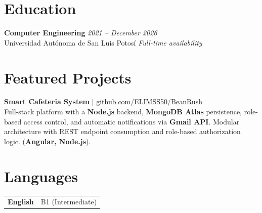 \documentclass[10pt,a4paper]{article}
\begin{document}
\section{Education}
\noindent\textbf{Computer Engineering} \hfill \textit{2021 -- December 2026} \\
Universidad Autónoma de San Luis Potosí \hfill \textit{Full-time availability} \\[0.05em]

\section{Featured Projects}

\noindent\textbf{Smart Cafeteria System} $|$ \href{https://github.com/ELIMSS50/BeanRush}{github.com/ELIMSS50/BeanRush} \\
Full-stack platform with a \textbf{Node.js} backend, \textbf{MongoDB Atlas} persistence, role-based access control, and automatic notifications via \textbf{Gmail API}. Modular architecture with REST endpoint consumption and role-based authorization logic. (\textbf{Angular, Node.js}).

\section{Languages}
\begin{tabularx}{\textwidth}{@{}l>{\raggedright\arraybackslash}X@{}}
  \textbf{English}  & B1 (Intermediate) \\
\end{tabularx}
\end{document}
